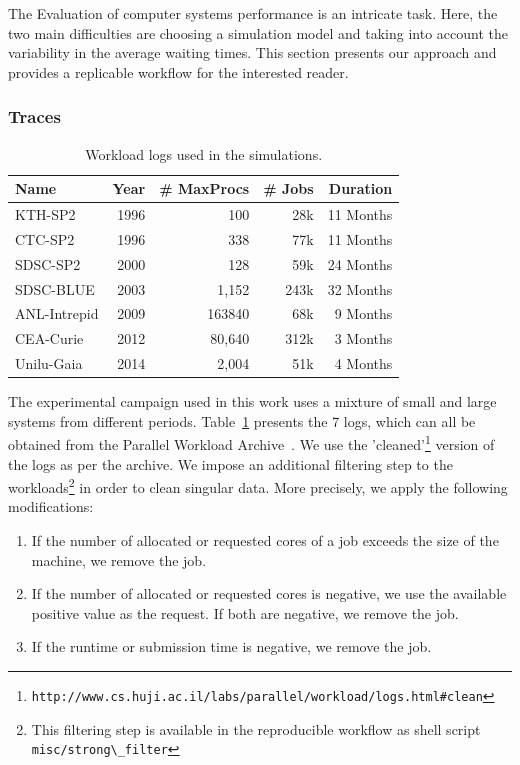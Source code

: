 \documentclass[sigconf]{acmart}
\newcommand{\ra}[1]{\renewcommand{\arraystretch}{#1}}
\begin{document}
The Evaluation of computer systems performance is an intricate
task\cite{feitbook}. Here, the two main difficulties are choosing a simulation
model and taking into account the variability in the average waiting times.
This section presents our approach and provides a replicable workflow
for the interested reader.

\subsubsection{Traces}
\label{sub:traces}

\begin{table}[ht]
  \centering
  \ra{1.3}
  \caption{Workload logs used in the simulations.}
  \label{tab:logs}
  \begin{tabular}{@{}lrrrr@{}}
    \hline
    Name          & Year & \# MaxProcs & \# Jobs & Duration\\
    \hline
    KTH-SP2       & 1996 & 100         & 28k     & 11 Months\\
    CTC-SP2       & 1996 & 338         & 77k     & 11 Months\\
    SDSC-SP2      & 2000 & 128         & 59k     & 24 Months\\
    SDSC-BLUE     & 2003 & 1,152       & 243k    & 32 Months\\
    ANL-Intrepid  & 2009 & 163840      & 68k     & 9  Months\\
    CEA-Curie     & 2012 & 80,640      & 312k    & 3  Months\\
    Unilu-Gaia    & 2014 & 2,004       & 51k     & 4  Months\\
    \hline
  \end{tabular}
\end{table}

The experimental campaign used in this work uses a mixture of small and large
systems from different periods. Table~\ref{tab:logs} presents the 7 logs, which
can all be obtained from the Parallel Workload
Archive~\cite{Feitelson20142967}. We use the
'cleaned'\footnote{\lstinline[basicstyle=\ttfamily\color{blue}]|http://www.cs.huji.ac.il/labs/parallel/workload/logs.html#clean|}
version of the logs as per the archive. We impose an additional filtering step
to the workloads\footnote{This filtering step is available in the reproducible
workflow\cite{repro} as shell script
\lstinline[basicstyle=\ttfamily\color{blue}]|misc/strong\_filter|} in order to
clean singular data. More precisely, we apply the following modifications:

\begin{enumerate}

  \item If the number of allocated or requested cores of a job  exceeds the
    size of the machine, we remove the job.

  \item If the number of allocated or requested cores is negative, we use the
    available positive value as the request. If both are negative, we remove
    the job.

  \item If the runtime or submission time is negative, we remove the job.

\end{enumerate}
\end{document}
